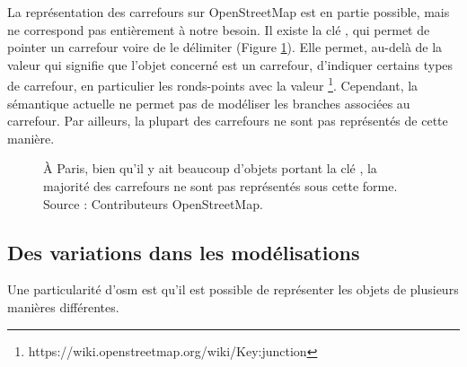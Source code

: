 \newpar{}


La représentation des carrefours sur OpenStreetMap est en partie possible, mais ne correspond pas entièrement à notre besoin. Il existe la clé , qui permet de pointer un carrefour voire de le délimiter (Figure \ref{fig:modelisation_carrefours_osm_paris}). Elle permet, au-delà de la valeur  qui signifie que l'objet concerné est un carrefour, d'indiquer certains types de carrefour, en particulier les ronds-points avec la valeur \footnote{https://wiki.openstreetmap.org/wiki/Key:junction}. Cependant, la sémantique actuelle ne permet pas de modéliser les branches associées au carrefour. Par ailleurs, la plupart des carrefours ne sont pas représentés de cette manière.

\begin{figure}
    \centering
    \caption[Les carrefours OSM à Paris.]{À Paris, bien qu'il y ait beaucoup d'objets portant la clé , la majorité des carrefours ne sont pas représentés sous cette forme. Source : Contributeurs OpenStreetMap.}
    \label{fig:modelisation_carrefours_osm_paris}
\end{figure}

\subsection{Des variations dans les modélisations}

\label{sec:modelisation_variation_pieton_osm}


Une particularité d'\gls{osm} est qu'il est possible de représenter les objets de plusieurs manières différentes. 

